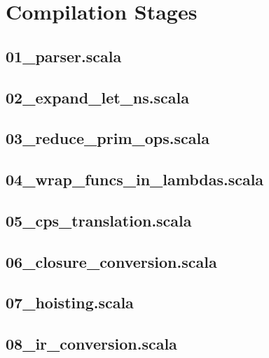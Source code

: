 \documentclass{article}
\begin{document}
    \tableofcontents


    \section{Compilation Stages}
    \subsection{01\_parser.scala}
    
    \newpage
    \subsection{02\_expand\_let\_ns.scala}
    
    \newpage
    \subsection{03\_reduce\_prim\_ops.scala}
    
    \newpage
    \subsection{04\_wrap\_funcs\_in\_lambdas.scala}
    
    \newpage
    \subsection{05\_cps\_translation.scala}
    
    \newpage
    \subsection{06\_closure\_conversion.scala}
    
    \newpage
    \subsection{07\_hoisting.scala}
    
    \newpage
    \subsection{08\_ir\_conversion.scala}
    
    \newpage
\end{document}
